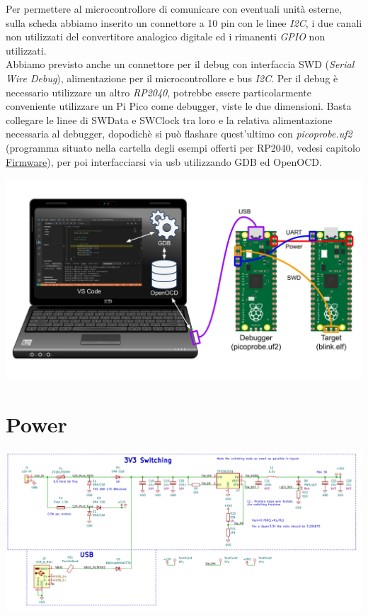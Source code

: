 \noindent Per permettere al microcontrollore di comunicare con eventuali unità
esterne, sulla scheda abbiamo inserito un connettore a 10 pin con le
linee \emph{I2C}, i due canali non utilizzati del convertitore analogico
digitale ed i rimanenti \emph{GPIO} non utilizzati.\\
Abbiamo previsto anche un connettore per il debug con interfaccia SWD
(\emph{Serial Wire Debug}), alimentazione per il microcontrollore e bus
\emph{I2C}. Per il debug è necessario utilizzare un altro \emph{RP2040},
potrebbe essere particolarmente conveniente utilizzare un Pi Pico come
debugger, viste le due dimensioni. Basta collegare le linee di SWData e
SWClock tra loro e la relativa alimentazione necessaria al debugger,
dopodichè si può flashare quest'ultimo con \emph{picoprobe.uf2}
(programma situato nella cartella degli esempi offerti per RP2040,
vedesi capitolo
\protect\hyperlink{_w8kvxnysumpc}{\underline{Firmware}}), per poi
interfacciarsi via usb utilizzando GDB ed OpenOCD.

\begin{center}
\includegraphics[scale=0.2]{figures/image18.png}
\captionsetup{type=figure}
\end{center}

\hypertarget{power}{%
\section{Power}\label{power}}

\begin{center}
\includegraphics[scale=0.45]{figures/image65.png}
\captionsetup{type=figure}
\end{center}

